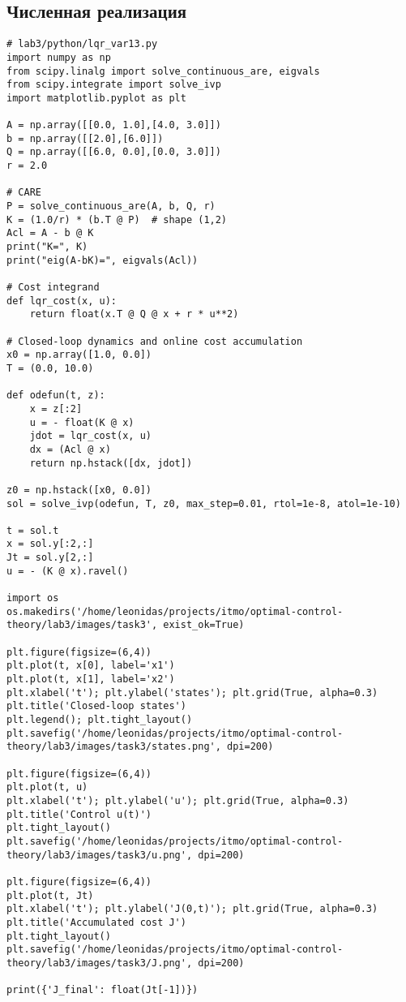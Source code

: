 \subsection{Численная реализация}
\begin{lstlisting}[caption={LQR (вариант 13): решение CARE, моделирование и графики},label={lst:lqr13}]
# lab3/python/lqr_var13.py
import numpy as np
from scipy.linalg import solve_continuous_are, eigvals
from scipy.integrate import solve_ivp
import matplotlib.pyplot as plt

A = np.array([[0.0, 1.0],[4.0, 3.0]])
b = np.array([[2.0],[6.0]])
Q = np.array([[6.0, 0.0],[0.0, 3.0]])
r = 2.0

# CARE
P = solve_continuous_are(A, b, Q, r)
K = (1.0/r) * (b.T @ P)  # shape (1,2)
Acl = A - b @ K
print("K=", K)
print("eig(A-bK)=", eigvals(Acl))

# Cost integrand
def lqr_cost(x, u):
    return float(x.T @ Q @ x + r * u**2)

# Closed-loop dynamics and online cost accumulation
x0 = np.array([1.0, 0.0])
T = (0.0, 10.0)

def odefun(t, z):
    x = z[:2]
    u = - float(K @ x)
    jdot = lqr_cost(x, u)
    dx = (Acl @ x)
    return np.hstack([dx, jdot])

z0 = np.hstack([x0, 0.0])
sol = solve_ivp(odefun, T, z0, max_step=0.01, rtol=1e-8, atol=1e-10)

t = sol.t
x = sol.y[:2,:]
Jt = sol.y[2,:]
u = - (K @ x).ravel()

import os
os.makedirs('/home/leonidas/projects/itmo/optimal-control-theory/lab3/images/task3', exist_ok=True)

plt.figure(figsize=(6,4))
plt.plot(t, x[0], label='x1')
plt.plot(t, x[1], label='x2')
plt.xlabel('t'); plt.ylabel('states'); plt.grid(True, alpha=0.3)
plt.title('Closed-loop states')
plt.legend(); plt.tight_layout()
plt.savefig('/home/leonidas/projects/itmo/optimal-control-theory/lab3/images/task3/states.png', dpi=200)

plt.figure(figsize=(6,4))
plt.plot(t, u)
plt.xlabel('t'); plt.ylabel('u'); plt.grid(True, alpha=0.3)
plt.title('Control u(t)')
plt.tight_layout()
plt.savefig('/home/leonidas/projects/itmo/optimal-control-theory/lab3/images/task3/u.png', dpi=200)

plt.figure(figsize=(6,4))
plt.plot(t, Jt)
plt.xlabel('t'); plt.ylabel('J(0,t)'); plt.grid(True, alpha=0.3)
plt.title('Accumulated cost J')
plt.tight_layout()
plt.savefig('/home/leonidas/projects/itmo/optimal-control-theory/lab3/images/task3/J.png', dpi=200)

print({'J_final': float(Jt[-1])})
\end{lstlisting}

